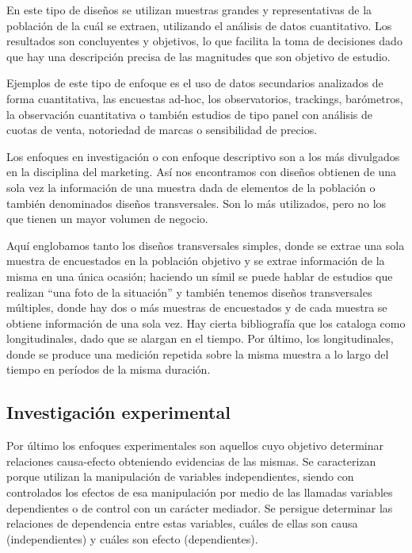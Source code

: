 \documentclass[
]{book}
\begin{document}
En este tipo de diseños se utilizan muestras grandes y representativas de la población de la cuál se extraen, utilizando el análisis de datos cuantitativo. Los resultados son concluyentes y objetivos, lo que facilita la toma de decisiones dado que hay una descripción precisa de las magnitudes que son objetivo de estudio.

Ejemplos de este tipo de enfoque es el uso de datos secundarios analizados de forma cuantitativa, las encuestas ad-hoc, los observatorios, trackings, barómetros, la observación cuantitativa o también estudios de tipo panel con análisis de cuotas de venta, notoriedad de marcas o sensibilidad de precios.

Los enfoques en investigación o con enfoque descriptivo son a los más divulgados en la disciplina del marketing. Así nos encontramos con diseños obtienen de una sola vez la información de una muestra dada de elementos de la población o también denominados diseños transversales. Son lo más utilizados, pero no los que tienen un mayor volumen de negocio.

Aquí englobamos tanto los diseños transversales simples, donde se extrae una sola muestra de encuestados en la población objetivo y se extrae información de la misma en una única ocasión; haciendo un símil se puede hablar de estudios que realizan ``una foto de la situación'' y también tenemos diseños transversales múltiples, donde hay dos o más muestras de encuestados y de cada muestra se obtiene información de una sola vez. Hay cierta bibliografía que los cataloga como longitudinales, dado que se alargan en el tiempo. Por último, los longitudinales, donde se produce una medición repetida sobre la misma muestra a lo largo del tiempo en períodos de la misma duración.

\hypertarget{investigaciuxf3n-experimental}{%
\subsection{Investigación experimental}\label{investigaciuxf3n-experimental}}

Por último los enfoques experimentales son aquellos cuyo objetivo determinar relaciones causa-efecto obteniendo evidencias de las mismas. Se caracterizan porque utilizan la manipulación de variables independientes, siendo con controlados los efectos de esa manipulación por medio de las llamadas variables dependientes o de control con un carácter mediador. Se persigue determinar las relaciones de dependencia entre estas variables, cuáles de ellas son causa (independientes) y cuáles son efecto (dependientes).
\end{document}

